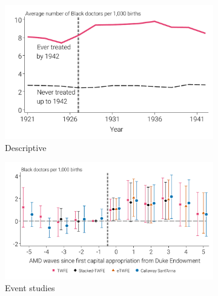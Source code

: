 \documentclass[12pt]{article}
\begin{document}
\newpage
{}
\begin{figure}
    \caption[Black physician results by treatment status, quality, and event time.]{Black physician results by treatment status, quality, and event time.}
    \centering
  \begin{minipage}{\linewidth}
  \begin{subfigure}[b]{0.49\columnwidth}
    \caption{\scriptsize{Descriptive}}
    \includegraphics[width=.9\linewidth]{../analysis/output/appendix/figure_c1a1_black_rMD_by_treatment_status.pdf}
  \end{subfigure} 
  \begin{subfigure}[b]{0.49\columnwidth}
    \caption{\scriptsize{Event studies}}
    \includegraphics[width=\linewidth]{../analysis/output/appendix/figure_c1b1_all_black_doctors_first_stage.pdf}
  \end{subfigure}  
  \begin{subfigure}[b]{0.49\columnwidth}

\end{subfigure}
\end{minipage}
\end{figure}
\end{document}
